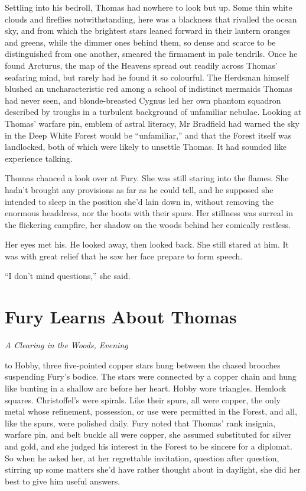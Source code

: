 \documentclass[11pt,a5paper]{article}
\newcommand{\alet}[1]{\textit{#1}\vspace{1em}}
\begin{document}
Settling into his bedroll, Thomas had nowhere to look but up. Some thin white clouds and fireflies notwithstanding, here was a blackness that rivalled the ocean sky, and from which the brightest stars leaned forward in their lantern oranges and greens, while the dimmer ones behind them, so dense and scarce to be distinguished from one another, smeared the firmament in pale tendrils. Once he found Arcturus, the map of the Heavens spread out readily across Thomas' seafaring mind, but rarely had he found it so colourful. The Herdsman himself blushed an uncharacteristic red among a school of indistinct mermaids Thomas had never seen, and blonde-breasted Cygnus led her own phantom squadron described by troughs in a turbulent background of unfamiliar nebulae. Looking at Thomas' warfare pin, emblem of astral literacy, Mr Bradfield had warned the sky in the Deep White Forest would be ``unfamiliar,'' and that the Forest itself was landlocked, both of which were likely to unsettle Thomas. It had sounded like experience talking.

Thomas chanced a look over at Fury. She was still staring into the flames. She hadn't brought any provisions as far as he could tell, and he supposed she intended to sleep in the position she'd lain down in, without removing the enormous headdress, nor the boots with their spurs. Her stillness was surreal in the flickering campfire, her shadow on the woods behind her comically restless.

Her eyes met his. He looked away, then looked back. She still stared at him. It was with great relief that he saw her face prepare to form speech.

``I don't mind questions,'' she said.

\newpage

\section{Fury Learns About Thomas}

\alet{A Clearing in the Woods, Evening}

 to Hobby, three five-pointed copper stars hung between the chased brooches suspending Fury's bodice. The stars were connected by a copper chain and hung like bunting in a shallow arc before her heart. Hobby wore triangles. Hemlock squares. Christoffel's were spirals. Like their spurs, all were copper, the only metal whose refinement, possession, or use were permitted in the Forest, and all, like the spurs, were polished daily. Fury noted that Thomas' rank insignia, warfare pin, and belt buckle all were copper, she assumed substituted for silver and gold, and she judged his interest in the Forest to be sincere for a diplomat. So when he asked her, at her regrettable invitation, question after question, stirring up some matters she'd have rather thought about in daylight, she did her best to give him useful answers.
\end{document}
